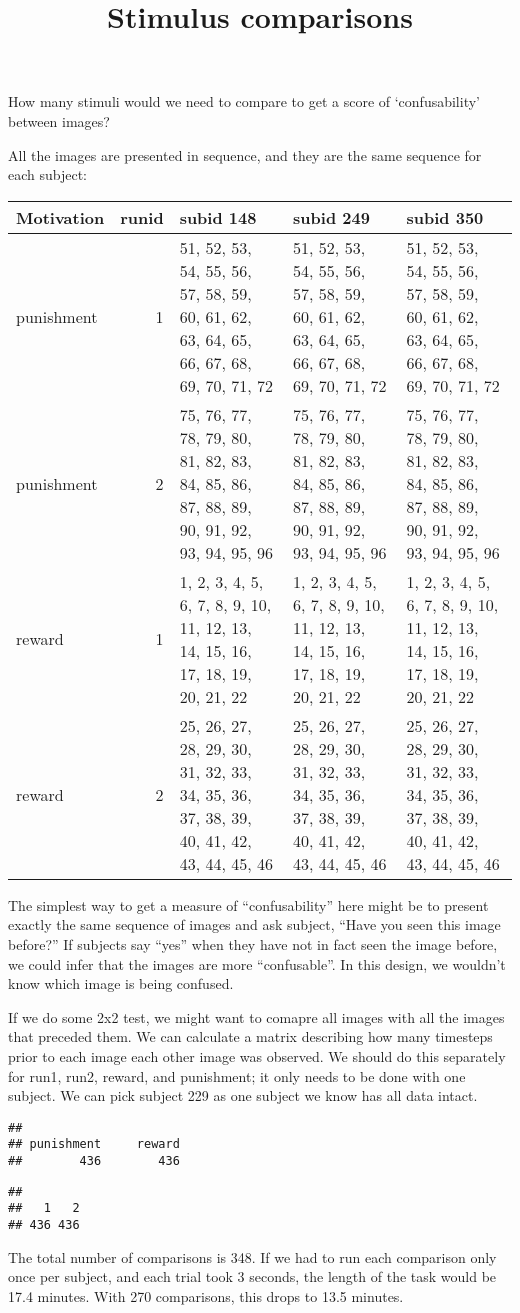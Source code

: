 \documentclass[]{article}
\title{Stimulus comparisons}
\author{}
\date{}
\begin{document}
\maketitle

How many stimuli would we need to compare to get a score of
`confusability' between images?

All the images are presented in sequence, and they are the same sequence
for each subject:

\begin{longtable}[]{@{}lrlll@{}}
\toprule
Motivation & runid & subid 148 & subid 249 & subid 350\tabularnewline
\midrule
\endhead
punishment & 1 & 51, 52, 53, 54, 55, 56, 57, 58, 59, 60, 61, 62, 63, 64,
65, 66, 67, 68, 69, 70, 71, 72 & 51, 52, 53, 54, 55, 56, 57, 58, 59, 60,
61, 62, 63, 64, 65, 66, 67, 68, 69, 70, 71, 72 & 51, 52, 53, 54, 55, 56,
57, 58, 59, 60, 61, 62, 63, 64, 65, 66, 67, 68, 69, 70, 71,
72\tabularnewline
punishment & 2 & 75, 76, 77, 78, 79, 80, 81, 82, 83, 84, 85, 86, 87, 88,
89, 90, 91, 92, 93, 94, 95, 96 & 75, 76, 77, 78, 79, 80, 81, 82, 83, 84,
85, 86, 87, 88, 89, 90, 91, 92, 93, 94, 95, 96 & 75, 76, 77, 78, 79, 80,
81, 82, 83, 84, 85, 86, 87, 88, 89, 90, 91, 92, 93, 94, 95,
96\tabularnewline
reward & 1 & 1, 2, 3, 4, 5, 6, 7, 8, 9, 10, 11, 12, 13, 14, 15, 16, 17,
18, 19, 20, 21, 22 & 1, 2, 3, 4, 5, 6, 7, 8, 9, 10, 11, 12, 13, 14, 15,
16, 17, 18, 19, 20, 21, 22 & 1, 2, 3, 4, 5, 6, 7, 8, 9, 10, 11, 12, 13,
14, 15, 16, 17, 18, 19, 20, 21, 22\tabularnewline
reward & 2 & 25, 26, 27, 28, 29, 30, 31, 32, 33, 34, 35, 36, 37, 38, 39,
40, 41, 42, 43, 44, 45, 46 & 25, 26, 27, 28, 29, 30, 31, 32, 33, 34, 35,
36, 37, 38, 39, 40, 41, 42, 43, 44, 45, 46 & 25, 26, 27, 28, 29, 30, 31,
32, 33, 34, 35, 36, 37, 38, 39, 40, 41, 42, 43, 44, 45,
46\tabularnewline
\bottomrule
\end{longtable}

The simplest way to get a measure of ``confusability'' here might be to
present exactly the same sequence of images and ask subject, ``Have you
seen this image before?'' If subjects say ``yes'' when they have not in
fact seen the image before, we could infer that the images are more
``confusable''. In this design, we wouldn't know which image is being
confused.

If we do some 2x2 test, we might want to comapre all images with all the
images that preceded them. We can calculate a matrix describing how many
timesteps prior to each image each other image was observed. We should
do this separately for run1, run2, reward, and punishment; it only needs
to be done with one subject. We can pick subject 229 as one subject we
know has all data intact.

\begin{verbatim}
## 
## punishment     reward 
##        436        436
\end{verbatim}

\begin{verbatim}
## 
##   1   2 
## 436 436
\end{verbatim}

The total number of comparisons is 348. If we had to run each comparison
only once per subject, and each trial took 3 seconds, the length of the
task would be 17.4 minutes. With 270 comparisons, this drops to 13.5
minutes.
\end{document}
